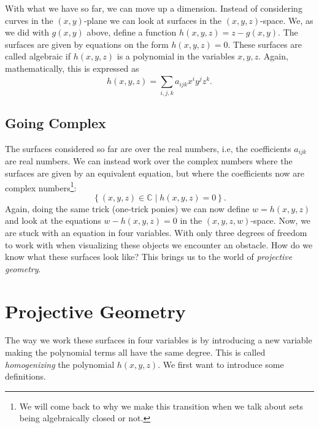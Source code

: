 \documentclass[a4paper]{article}
\theoremstyle{definition}
\theoremstyle{plain}
\newcommand{\C}{\ensuremath{\mathbb{C}}}
\begin{document}
    With what we have so far, we can move up a dimension. Instead of
    considering curves in the $(x, y)$-plane we can look at surfaces in the
    $(x, y, z)$-space. We, as we did with $g(x, y)$ above, define a function
    $h(x, y, z) = z - g(x, y)$. The surfaces are given by equations on the form
    $h(x, y, z) = 0$. These surfaces are called algebraic if $h(x, y, z)$ is a
    polynomial in the variables $x, y, z$. Again, mathematically, this is
    expressed as
    \begin{equation}
        \label{eq:algebraic_surfaces}
        h(x, y, z) = \sum^{}_{i, j, k} a_{ijk}x^iy^jz^k.
    \end{equation}

    \subsection{Going Complex}
    \label{sub:going_complex}

    The surfaces considered so far are over the real numbers, i.e, the
    coefficients $a_{ijk}$ are real numbers. We can instead work over the
    complex numbers where the surfaces are given by an equivalent equation, but
    where the coefficients now are complex numbers\footnote{We will come back
    to why we make this transition when we talk about sets being algebraically
    closed or not.}:
    \begin{equation}
        \left\{ (x, y, z) \in \C \mid h(x, y, z) = 0 \right\}.
    \end{equation}
    Again, doing the same trick (one-trick ponies) we can now define $w = h(x,
    y, z)$ and look at the equations $w - h(x, y, z) = 0$ in the $(x, y, z,
    w)$-space. Now, we are stuck with an equation in four variables. With only
    three degrees of freedom to work with when visualizing these objects we
    encounter an obstacle. How do we know what these surfaces look like? This
    brings us to the world of \emph{projective geometry}.

    \section{Projective Geometry}
    \label{sec:projective_geometry}
    
    The way we work these surfaces in four variables is by introducing a new
    variable making the polynomial terms all have the same degree.  This is
    called \emph{homogenizing} the polynomial $h(x, y, z)$. We first want to
    introduce some definitions.
\end{document}
